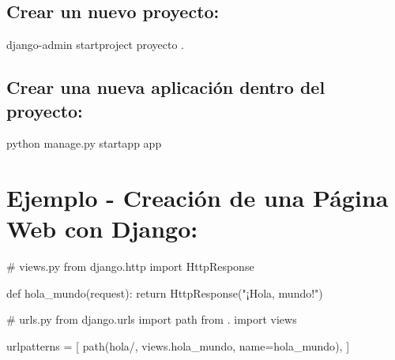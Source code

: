 \documentclass[
  a4paper,
  DIV=11,
  numbers=noendperiod,
  onepage,
  openany]{scrreprt}
\newenvironment{Shaded}{\begin{snugshade}}{\end{snugshade}}
\newcommand{\CommentTok}[1]{\textcolor[rgb]{0.37,0.37,0.37}{#1}}
\newcommand{\ControlFlowTok}[1]{\textcolor[rgb]{0.00,0.23,0.31}{#1}}
\newcommand{\ExtensionTok}[1]{\textcolor[rgb]{0.00,0.23,0.31}{#1}}
\newcommand{\ImportTok}[1]{\textcolor[rgb]{0.00,0.46,0.62}{#1}}
\newcommand{\KeywordTok}[1]{\textcolor[rgb]{0.00,0.23,0.31}{#1}}
\newcommand{\NormalTok}[1]{\textcolor[rgb]{0.00,0.23,0.31}{#1}}
\newcommand{\OperatorTok}[1]{\textcolor[rgb]{0.37,0.37,0.37}{#1}}
\newcommand{\StringTok}[1]{\textcolor[rgb]{0.13,0.47,0.30}{#1}}
\begin{document}
\hypertarget{crear-un-nuevo-proyecto}{%
\subsection{Crear un nuevo proyecto:}\label{crear-un-nuevo-proyecto}}

\begin{Shaded}
\begin{Highlighting}[]
\ExtensionTok{django{-}admin}\NormalTok{ startproject proyecto .}
\end{Highlighting}
\end{Shaded}

\hypertarget{crear-una-nueva-aplicaciuxf3n-dentro-del-proyecto}{%
\subsection{Crear una nueva aplicación dentro del
proyecto:}\label{crear-una-nueva-aplicaciuxf3n-dentro-del-proyecto}}

\begin{Shaded}
\begin{Highlighting}[]
\ExtensionTok{python}\NormalTok{ manage.py startapp app}
\end{Highlighting}
\end{Shaded}

\hypertarget{ejemplo---creaciuxf3n-de-una-puxe1gina-web-con-django}{%
\section{Ejemplo - Creación de una Página Web con
Django:}\label{ejemplo---creaciuxf3n-de-una-puxe1gina-web-con-django}}

\begin{Shaded}
\begin{Highlighting}[]
\CommentTok{\# views.py}
\ImportTok{from}\NormalTok{ django.http }\ImportTok{import}\NormalTok{ HttpResponse}

\KeywordTok{def}\NormalTok{ hola\_mundo(request):}
    \ControlFlowTok{return}\NormalTok{ HttpResponse(}\StringTok{"¡Hola, mundo!"}\NormalTok{)}
\end{Highlighting}
\end{Shaded}

\begin{Shaded}
\begin{Highlighting}[]
\CommentTok{\# urls.py}
\ImportTok{from}\NormalTok{ django.urls }\ImportTok{import}\NormalTok{ path}
\ImportTok{from}\NormalTok{ . }\ImportTok{import}\NormalTok{ views}

\NormalTok{urlpatterns }\OperatorTok{=}\NormalTok{ [}
\NormalTok{    path(}\StringTok{\textquotesingle{}hola/\textquotesingle{}}\NormalTok{, views.hola\_mundo, name}\OperatorTok{=}\StringTok{\textquotesingle{}hola\_mundo\textquotesingle{}}\NormalTok{),}
\NormalTok{]}
\end{Highlighting}
\end{Shaded}
\end{document}
